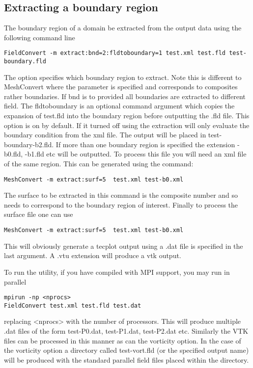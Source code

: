 \subsection{Extracting a boundary region}
The boundary region of a domain be extracted from the output data using the following command line
\begin{lstlisting}[style=BashInputStyle]
FieldConvert -m extract:bnd=2:fldtoboundary=1 test.xml test.fld test-boundary.fld
\end{lstlisting}
The option  specifies which boundary region to extract. Note this is different to MeshConvert where the parameter  is specified and corresponds to composites rather boundaries. If bnd is to provided all boundaries are extracted to different field. The fldtoboundary is an optional command argument which copies the expansion of test.fld into the boundary region before outputting the .fld file. This option is on by default. If it turned off using  the extraction will only evaluate the boundary condition from the xml file. The output will be placed in test-boundary-b2.fld. If more than one boundary region is specified the extension -b0.fld, -b1.fld etc will be outputted. To process this file you will need an xml file of the same region. This can be generated using the command:
\begin{lstlisting}[style=BashInputStyle]
MeshConvert -m extract:surf=5  test.xml test-b0.xml
\end{lstlisting}
The surface to be extracted in this command is the composite number and so needs to correspond to the boundary region of interest. Finally to process the surface file one can use
\begin{lstlisting}[style=BashInputStyle]
MeshConvert -m extract:surf=5  test.xml test-b0.xml
\end{lstlisting}
This will obviously generate a tecplot output using a .dat file is specified in the last argument. A .vtu extension will produce a vtk output.

To run the utility, if you have compiled \nekpp with MPI support, you may run in
parallel
\begin{lstlisting}[style=BashInputStyle] mpirun -np <nprocs>
FieldConvert test.xml test.fld test.dat
\end{lstlisting}
replacing <nprocs> with the number of processors. This will produce multiple
.dat files of the form test-P0.dat, test-P1.dat, test-P2.dat etc. Similarly the
VTK files can be processed in this manner as can the vorticity option. In the
case of the vorticity option a directory called test-vort.fld (or the specified
output name) will be produced with the standard parallel field files placed
within the directory.

